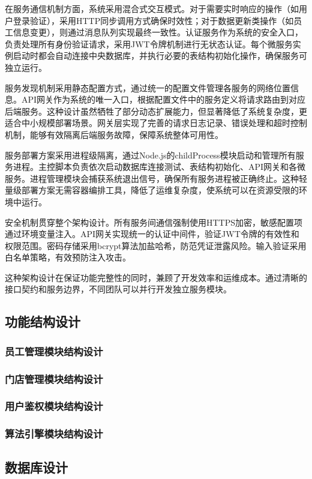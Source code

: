 \documentclass{ctexart}
\begin{document}
在服务通信机制方面，系统采用混合式交互模式。对于需要实时响应的操作（如用户登录验证），采用HTTP同步调用方式确保时效性；对于数据更新类操作（如员工信息变更），则通过消息队列实现最终一致性。认证服务作为系统的安全入口，负责处理所有身份验证请求，采用JWT令牌机制进行无状态认证。每个微服务实例启动时都会自动连接中央数据库，并执行必要的表结构初始化操作，确保服务可独立运行。

服务发现机制采用静态配置方式，通过统一的配置文件管理各服务的网络位置信息。API网关作为系统的唯一入口，根据配置文件中的服务定义将请求路由到对应后端服务。这种设计虽然牺牲了部分动态扩展能力，但显著降低了系统复杂度，更适合中小规模部署场景。网关层实现了完善的请求日志记录、错误处理和超时控制机制，能够有效隔离后端服务故障，保障系统整体可用性。

服务部署方案采用进程级隔离，通过Node.js的childProcess模块启动和管理所有服务进程。主控脚本负责依次启动数据库连接测试、表结构初始化、API网关和各微服务。进程管理模块会捕获系统退出信号，确保所有服务进程被正确终止。这种轻量级部署方案无需容器编排工具，降低了运维复杂度，使系统可以在资源受限的环境中运行。

安全机制贯穿整个架构设计。所有服务间通信强制使用HTTPS加密，敏感配置项通过环境变量注入。API网关实现统一的认证中间件，验证JWT令牌的有效性和权限范围。密码存储采用bcrypt算法加盐哈希，防范凭证泄露风险。输入验证采用白名单策略，有效预防注入攻击。

这种架构设计在保证功能完整性的同时，兼顾了开发效率和运维成本。通过清晰的接口契约和服务边界，不同团队可以并行开发独立服务模块。


\subsection{功能结构设计}
\subsubsection{员工管理模块结构设计}
\subsubsection{门店管理模块结构设计}
\subsubsection{用户鉴权模块结构设计}
\subsubsection{算法引擎模块结构设计}

\subsection{数据库设计}
\end{document}
